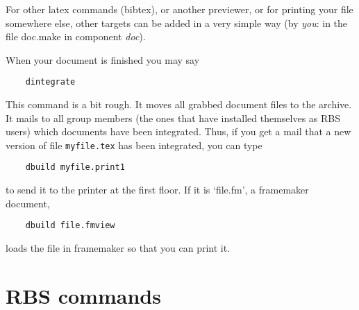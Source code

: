 For other latex commands (bibtex), or
another previewer, or for printing your file somewhere else, other 
targets can be added in a very simple way (by {\em you}: in the file doc.make 
in component {\em doc}). 

When your document is finished you may say
\begin{verbatim}
    dintegrate
\end{verbatim}
This command is a bit rough. It moves all grabbed document files to
the archive. It mails to all group members (the ones that have installed
themselves as RBS users) which documents have been integrated. Thus,
if you get a mail that a new version of file \verb+myfile.tex+
has been integrated, you can type 
\begin{verbatim}
    dbuild myfile.print1
\end{verbatim}
to send it to the printer at the first floor. If it is `file.fm', a
framemaker document,
\begin{verbatim}
    dbuild file.fmview
\end{verbatim}
loads the file in framemaker so that you can print it.
\section{RBS commands}
